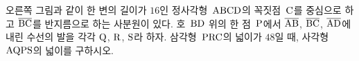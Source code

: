 \noindent\begin{minipage}[t]{0.58\linewidth}\vspace{0pt}\raggedright 오른쪽 그림과 같이 한 변의 길이가 $16$인 정사각형~$\mathrm{ABCD}$의 꼭짓점~$\mathrm{C}$를 중심으로 하고 $\overline{\mathrm{BC}}$를 반지름으로 하는 사분원이 있다. 호~$\mathrm{BD}$ 위의 한 점~$\mathrm{P}$에서 $\overline{\mathrm{AB}}$, $\overline{\mathrm{BC}}$, $\overline{\mathrm{AD}}$에 내린 수선의 발을 각각 $\mathrm{Q}$, $\mathrm{R}$, $\mathrm{S}$라 하자. 삼각형~$\mathrm{PRC}$의 넓이가 $48$일 때, 사각형~$\mathrm{AQPS}$의 넓이를 구하시오.\end{minipage}\hfill\begin{minipage}[t]{0.4\linewidth}\vspace{0pt}\centering \resizebox{\ifdim\width>\linewidth\linewidth\else\width\fi}{!}{}\end{minipage}\par
